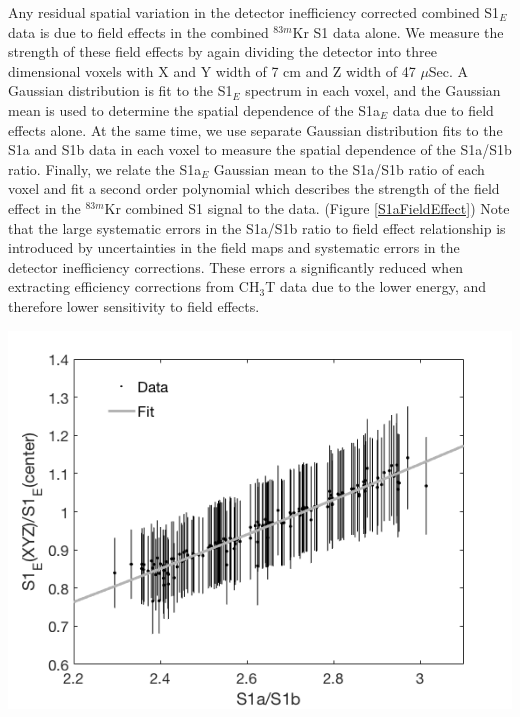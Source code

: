 Any residual spatial variation in the detector inefficiency corrected combined S1$_E$ data is due to field effects in the combined $^{83m}$Kr S1 data alone.  We measure the strength of these field effects by again dividing the detector into three dimensional voxels with X and Y width of 7 cm and Z width of 47 $\mu$Sec.  A Gaussian distribution is fit to the S1$_E$ spectrum in each voxel, and the Gaussian mean is used to determine the spatial dependence of the S1a$_E$ data due to field effects alone.  At the same time, we use separate Gaussian distribution fits to the S1a and S1b data in each voxel to measure the spatial dependence of the S1a/S1b ratio.  Finally, we relate the S1a$_E$ Gaussian mean to the S1a/S1b ratio of each voxel and fit a second order polynomial which describes the strength of the field effect in the $^{83m}$Kr combined S1 signal to the data. (Figure \ref{S1aFieldEffect}) Note that the large systematic errors in the S1a/S1b ratio to field effect relationship is introduced by uncertainties in the field maps and systematic errors in the detector inefficiency corrections.  These errors a significantly reduced when extracting efficiency corrections from CH$_3$T data due to the lower energy, and therefore lower sensitivity to field effects.

\begin{minipage}{8.15cm}
\begin{center}
\includegraphics[scale=0.4]{figures/Fig6.png}
\label{S1aFieldEffect}
\end{center}
\end{minipage}

